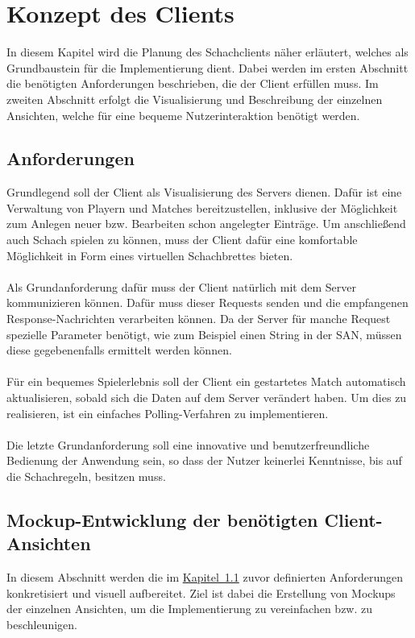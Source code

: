 
\chapter{Konzept des Clients}\label{sec:conceptClient}
In diesem Kapitel wird die Planung des Schachclients näher erläutert, welches als Grundbaustein für die Implementierung dient. Dabei werden im ersten Abschnitt die benötigten Anforderungen beschrieben, die der Client erfüllen muss. Im zweiten Abschnitt erfolgt die Visualisierung und Beschreibung der einzelnen Ansichten, welche für eine bequeme Nutzerinteraktion benötigt werden.

\section{Anforderungen}\label{sec:anforderungenClient}
Grundlegend soll der Client als Visualisierung des Servers dienen. Dafür ist eine Verwaltung von Playern und Matches bereitzustellen, inklusive der Möglichkeit zum Anlegen neuer bzw. Bearbeiten schon angelegter Einträge. Um anschließend auch Schach spielen zu können, muss der Client dafür eine komfortable Möglichkeit in Form eines virtuellen Schachbrettes bieten.\\
\\
Als Grundanforderung dafür muss der Client natürlich mit dem Server kommunizieren können. Dafür muss dieser Requests senden und die empfangenen Response-Nachrichten verarbeiten können. Da der Server für manche Request spezielle Parameter benötigt, wie zum Beispiel einen String in der \gls{SAN}, müssen diese gegebenenfalls ermittelt werden können.\\
\\
Für ein bequemes Spielerlebnis soll der Client ein gestartetes Match automatisch aktualisieren, sobald sich die Daten auf dem Server verändert haben. Um dies zu realisieren, ist ein einfaches Polling-Verfahren zu implementieren.\\
\\ 
Die letzte Grundanforderung soll eine innovative und benutzerfreundliche Bedienung der Anwendung sein, so dass der Nutzer keinerlei Kenntnisse, bis auf die Schachregeln, besitzen muss.

\section{Mockup-Entwicklung der benötigten Client-Ansichten}\label{sec:views}
In diesem Abschnitt werden die im \hyperref[sec:anforderungenClient]{Kapitel~\ref{sec:anforderungenClient}} zuvor definierten Anforderungen konkretisiert und visuell aufbereitet. Ziel ist dabei die Erstellung von Mockups der einzelnen Ansichten, um die Implementierung zu vereinfachen bzw. zu beschleunigen.

